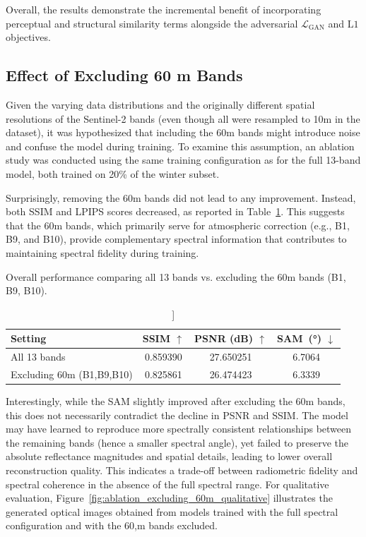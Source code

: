Overall, the results demonstrate the incremental benefit of incorporating perceptual and structural similarity terms alongside the adversarial $\mathcal{L}_{\text{GAN}}$ and $\mathrm{L1}$ objectives. 

\subsection{Effect of Excluding 60 m Bands}
Given the varying data distributions and the originally different spatial resolutions of the Sentinel-2 bands (even though all were resampled to 10m in the dataset), it was hypothesized that including the 60m bands might introduce noise and confuse the model during training. To examine this assumption, an ablation study was conducted using the same training configuration as for the full 13-band model, both trained on 20\% of the winter subset.

Surprisingly, removing the 60m bands did not lead to any improvement. Instead, both SSIM and LPIPS scores decreased, as reported in Table~\ref{tab:ablation_excluding_60m}. This suggests that the 60m bands, which primarily serve for atmospheric correction (e.g., B1, B9, and B10), provide complementary spectral information that contributes to maintaining spectral fidelity during training.

\begin{table}[h!]
    \centering
    \setlength{\tabcolsep}{8pt}
    \renewcommand{\arraystretch}{1.15}
    \caption[[Overall performance when excluding 60m bands]]{Overall performance comparing all 13 bands vs. excluding the 60m bands (B1, B9, B10).}
    \label{tab:ablation_excluding_60m}
    \begin{tabular}{lccc}
        \hline
        \textbf{Setting} & \textbf{SSIM $\uparrow$} & \textbf{PSNR (dB) $\uparrow$} & \textbf{SAM~(°) $\downarrow$} \\
        \hline
        All 13 bands & 0.859390 & 27.650251 & 6.7064 \\
        Excluding 60m (B1,B9,B10) & 0.825861 & 26.474423 & 6.3339 \\
        \hline
    \end{tabular}
\end{table}

Interestingly, while the SAM slightly improved after excluding the 60m bands, this does not necessarily contradict the decline in PSNR and SSIM. The model may have learned to reproduce more spectrally consistent relationships between the remaining bands (hence a smaller spectral angle), yet failed to preserve the absolute reflectance magnitudes and spatial details, leading to lower overall reconstruction quality. This indicates a trade-off between radiometric fidelity and spectral coherence in the absence of the full spectral range. For qualitative evaluation, Figure~\ref{fig:ablation_excluding_60m_qualitative} illustrates the generated optical images obtained from models trained with the full spectral configuration and with the 60,m bands excluded.

